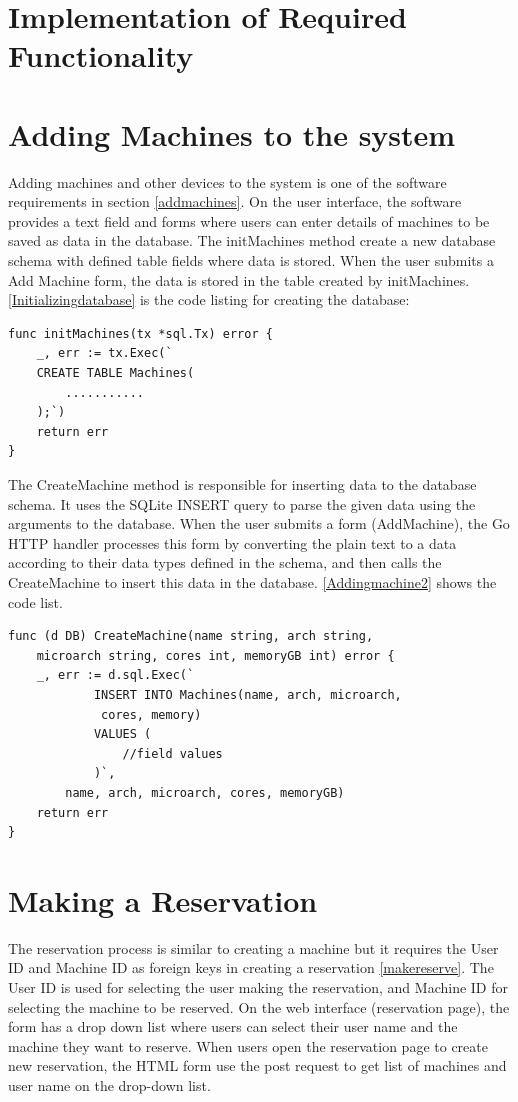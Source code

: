 \section{Implementation of Required Functionality}
\section*{Adding Machines to the system}
Adding machines and other devices to the system is one of the software requirements in section \ref{addmachines}. On the user interface, the software provides a text field and forms where users can enter details of machines to be saved as data in the database. The initMachines method create a new database schema with defined table fields where data is stored. When the user submits a Add Machine form, the data is stored in the table created by initMachines. 
 \autoref{Initializingdatabase} is the code listing for creating the database:
\lstset{basicstyle=\footnotesize\ttfamily,breaklines=true}
\lstset{framextopmargin=50pt,frame=bottomline}
\begin{lstlisting}[caption=Creating table for machine, label=Initializingdatabase]
func initMachines(tx *sql.Tx) error {
	_, err := tx.Exec(`
	CREATE TABLE Machines(
		...........
	);`)
	return err
}
\end{lstlisting}
The CreateMachine method is responsible for inserting data to the database schema. It uses the SQLite INSERT query to parse the given data using the arguments to the database. When the user submits a form (AddMachine), the Go HTTP handler processes this form by converting the plain text to a data according to their data types defined in the schema, and then calls the CreateMachine to insert this data in the database. \autoref{Addingmachine2} shows the code list.
\begin{lstlisting}[caption=Adding machines details, label=Addingmachine2]
func (d DB) CreateMachine(name string, arch string,
	microarch string, cores int, memoryGB int) error {
	_, err := d.sql.Exec(`
			INSERT INTO Machines(name, arch, microarch,
			 cores, memory)
			VALUES (
				//field values
			)`,
		name, arch, microarch, cores, memoryGB)
	return err
}
\end{lstlisting}

\section*{Making a Reservation}
The reservation process is similar to creating a machine but it requires the User ID and Machine ID as foreign keys in creating a reservation \ref{makereserve}. The User ID is used for selecting the user making the reservation, and Machine ID for selecting the machine to be reserved. On the web interface (reservation page), the form has a drop down list where users can select their user name and the machine they want to reserve. When users open the reservation page to create new reservation, the HTML form use the post request to get list of machines and user name on the drop-down list.

